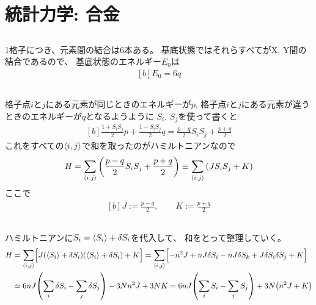 \documentclass[../../master.tex]{subfiles}
\begin{document}
\chapter{統計力学: 合金}
\section{}
1格子につき、元素間の結合は6本ある。
基底状態ではそれらすべてがX, Y間の結合であるので、
基底状態のエネルギー\(E_0\)は
\begin{equation}\begin{aligned}[b]
    E_0 = 6q
\end{aligned}\end{equation}

\section{}
格子点\(i\)と\(j\)にある元素が同じときのエネルギーが\(p\),
格子点\(i\)と\(j\)にある元素が違うときのエネルギーが\(q\)となるようように
\(S_i,\,S_j\)を使って書くと
\begin{equation}\begin{aligned}[b]
    \frac{1+S_iS_j}{2}p + \frac{1-S_iS_j}{2}q = \frac{p-q}{2}S_iS_j + \frac{p+q}{2}
\end{aligned}\end{equation}
これをすべての\(\ev{i,j}\)で和を取ったのがハミルトニアンなので
\begin{equation}\begin{aligned}[b]
    H = \sum_{\ev{i.j}}\qty(\frac{p-q}{2}S_iS_j + \frac{p+q}{2})
    \equiv \sum_{\ev{i.j}}\qty(JS_iS_j + K)
\end{aligned}\end{equation}
ここで
\begin{equation}\begin{aligned}[b]
    J := \frac{p-q}{2},\qquad  K := \frac{p+q}{2}
\end{aligned}\end{equation}

\section{}
ハミルトニアンに\(S_i = \ev{S_i}+\delta S_i\)を代入して、
和をとって整理していく。
\begin{equation}\begin{aligned}[b]
    H &= \sum_{\ev{i,j}}\Bigl[J\qty(\ev{S_i}+\delta S_i)(\ev{S_i}+\delta S_i)+K\Bigr]
    = \sum_{\ev{i,j}}\Bigl[-n^2J+nJ\delta S_i-nJ\delta S_k +J\delta S_i \delta S_j+K\Bigr]\\
    &\simeq 6nJ\qty(\sum_i \delta S_i - \sum_j \delta S_j)-3Nn^2J+3NK
    = 6nJ\qty(\sum_i S_i - \sum_j S_j)+3N\qty(n^2J+K)
\end{aligned}\end{equation}
\end{document}
